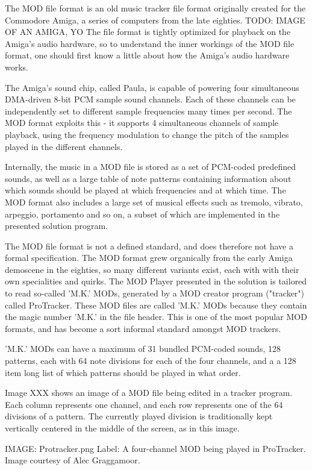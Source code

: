 
The MOD file format is an old music tracker file format originally created for the Commodore Amiga, a series of computers from the late eighties. TODO: IMAGE OF AN AMIGA, YO
The file format is tightly optimized for playback on the Amiga's audio hardware, so to understand the inner workings of the MOD file format, one should first know a little about how the Amiga's audio hardware works.

The Amiga's sound chip, called Paula, is capable of powering four simultaneous DMA-driven 8-bit PCM sample sound channels.
Each of these channels can be independently set to different sample frequencies many times per second.
The MOD format exploits this - it supports 4 simultaneous channels of sample playback, using the frequency modulation to change the pitch of the samples played in the different channels.

Internally, the music in a MOD file is stored as a set of PCM-coded predefined sounds, as well as a large table of note patterns containing information about which sounds should be played at which frequencies and at which time.
The MOD format also includes a large set of musical effects such as tremolo, vibrato, arpeggio, portamento and so on, a subset of which are implemented in the presented solution program.

The MOD file format is not a defined standard, and does therefore not have a formal specification.
The MOD format grew organically from the early Amiga demoscene in the eighties, so many different variants exist, each with with their own specialities and quirks.
The MOD Player presented in the solution is tailored to read so-called 'M.K.' MODs, generated by a MOD creator program ("tracker") called ProTracker.
These MOD files are called 'M.K.' MODs because they contain the magic number 'M.K.' in the file header.
This is one of the most popular MOD formats, and has become a sort informal standard amongst MOD trackers.

'M.K.' MODs can have a maximum of 31 bundled PCM-coded sounds, 128 patterns, each with 64 note divisions for each of the four channels, and a a 128 item long list of which patterns should be played in what order.

Image XXX shows an image of a MOD file being edited in a tracker program.
Each column represents one channel, and each row represents one of the 64 divisions of a pattern.
The currently played division is traditionally kept vertically centered in the middle of the screen, as in this image.


IMAGE: Protracker.png
Label: A four-channel MOD being played in ProTracker. Image courtesy of Alec Graggamoor.
